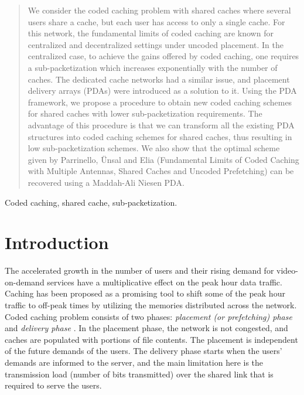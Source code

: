 \documentclass[conference,a4paper,10pt]{IEEEtran}
\begin{document}
\begin{abstract}
We consider the coded caching problem with shared caches where several users share a cache, but each user has access to only a single cache. For this network, the fundamental limits of coded caching are known for centralized and decentralized settings under uncoded placement. In the centralized case, to achieve the gains offered by coded caching, one requires a sub-packetization which increases exponentially with the number of caches. The dedicated cache networks had a similar issue, and placement delivery arrays (PDAs) were introduced as a solution to it. Using the PDA framework, we propose a procedure to obtain new coded caching schemes for shared caches with lower sub-packetization requirements. The advantage of this procedure is that we can  transform all the existing PDA structures into coded caching schemes for shared caches, thus resulting in low sub-packetization schemes.
We also show that the optimal scheme given by Parrinello, Ünsal and Elia (Fundamental Limits of Coded Caching with Multiple Antennas, Shared Caches and Uncoded Prefetching) can be recovered using a Maddah-Ali Niesen PDA.



 

\end{abstract}

\begin{IEEEkeywords}
 Coded caching, shared cache, sub-packetization.
\end{IEEEkeywords}

\section{Introduction}
The accelerated growth in the number of users and their rising demand for video-on-demand services have a multiplicative effect on the peak hour data traffic. Caching has been proposed as a promising tool to shift some of the peak hour traffic to off-peak times by utilizing the memories distributed across the network. Coded caching problem consists of two phases: \textit{placement (or prefetching) phase} and \textit{delivery phase} \cite{MaN}. In the placement phase, the network is not congested, and caches are populated with portions of file contents. The placement is independent of the future demands of the users. The delivery phase starts when the users' demands are informed to the server, and the main limitation here is the transmission load (number of bits transmitted) over the shared link that is required to serve the users. 
\end{document}
